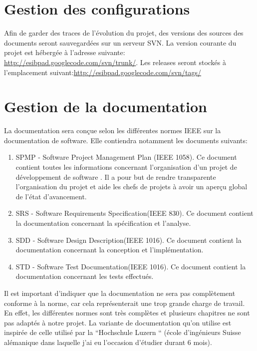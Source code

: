 \section{Gestion des configurations}
Afin de garder des traces de l'évolution du projet, des versions des sources des documents seront sauvegardées sur un serveur \gls{SVN}. La version courante du projet est hébergée à l'adresse suivante: \url{http://esibpad.googlecode.com/svn/trunk/}. Les releases seront stockés  à l'emplacement suivant:\url{http://esibpad.googlecode.com/svn/tags/} 



\section{Gestion de la documentation}
 La documentation sera conçue selon les différentes normes IEEE sur la documentation de software. Elle contiendra notamment les documents suivants:

\begin{enumerate}
	\item \gls{SPMP} - Software Project Management Plan (IEEE 1058).  Ce document contient toutes les informations concernant l'organisation d'un projet de développement de software . Il a pour but de rendre transparente l'organisation du projet et aide les chefs de projets à avoir un aperçu global de l'état d'avancement.
	\item \gls{SRS} - Software Requirements Specification(IEEE 830). Ce document contient la documentation concernant la spécification et l'analyse.
	\item \gls{SDD} - Software Design Description(IEEE 1016). Ce document contient la documentation concernant la conception  et l'implémentation.
	\item \gls{STD} - Software Test Documentation(IEEE 1016). Ce document contient la documentation concernant les tests effectués.
\end{enumerate}	

Il est important d'indiquer que la documentation ne sera pas complètement conforme à la norme, car cela représenterait une trop grande charge de travail. En effet, les différentes normes sont très complètes et plusieurs chapitres ne sont pas adaptés à notre projet. La variante de documentation qu'on utilise est inspirée de celle utilisé par la ``Hochschule Luzern `` (école d'ingénieurs Suisse alémanique dans laquelle j'ai eu l'occasion d'étudier durant 6 mois).

